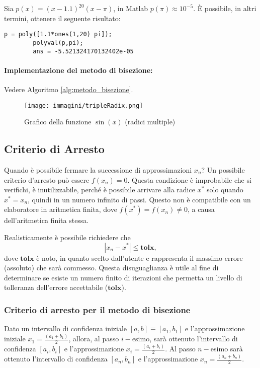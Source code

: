 \begin{example}
	Sia $p(x)=(x-1.1)^{20}(x-\pi)$, in Matlab $p(\pi)\approx 10^{-5}$. È possibile, in altri termini, ottenere il seguente risultato:
	\begin{lstlisting}[style=Matlab-editor]
		p = poly([1.1*ones(1,20) pi]);
		polyval(p,pi);
		ans = -5.521324170132402e-05
	\end{lstlisting}
\end{example}

\paragraph{Implementazione del metodo di bisezione:} Vedere Algoritmo \ref{alg:metodo_bisezione}.

\begin{figure}
	\centering
	\texttt{[image: immagini/tripleRadix.png]}
	\caption{\label{fig:sinx}Grafico della funzione $\sin{(x)}$ (radici multiple)}
\end{figure}

\subsection{Criterio di Arresto}\label{ssec:criterio_arresto}
Quando è possibile fermare la successione di approssimazioni $x_n$? Un possibile criterio d'arresto può essere $f(x_n)=0$. Questa condizione è improbabile che si verifichi, è inutilizzabile, perché è possibile arrivare alla radice $x^*$ solo quando $x^*=x_n$, quindi in un numero infinito di passi. Questo non è compatibile con un elaboratore in aritmetica finita, dove $f(x^*)=f(x_n)\neq 0$, a causa dell'aritmetica finita stessa.

Realisticamente è possibile richiedere che 
\begin{equation}\label{eq:x_n_leq_tolx}
	|x_n-x^*|\leq \boldsymbol{tolx},
\end{equation}
dove $\boldsymbol{tolx}$ è noto, in quanto scelto dall'utente e rappresenta il massimo errore (assoluto) che sarà commesso. Questa disuguaglianza è utile al fine di determinare se esiste un numero finito di iterazioni che permetta un livello di tolleranza dell'errore accettabile ($\boldsymbol{tolx}$).

\subsubsection{Criterio di arresto per il metodo di bisezione} Dato un intervallo di confidenza iniziale $[a,b]\equiv [a_1,b_1]$ e l'approssimazione iniziale $x_1=\frac{(a_1+b_1)}{2}$, allora, al passo $i-$esimo, sarà ottenuto l'intervallo di confidenza $[a_i,b_i]$ e l'approssimazione $x_i=\frac{(a_i+b_i)}{2}$. Al passo $n-$esimo sarà ottenuto l'intervallo di confidenza $[a_n,b_n]$ e l'approssimazione $x_n=\frac{(a_n+b_n)}{2}$.

